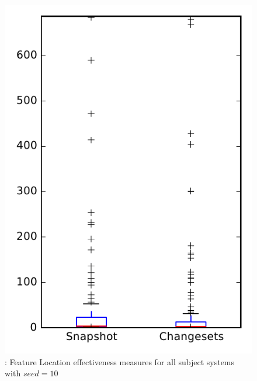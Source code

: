 
\begin{figure}
\centering
\includegraphics[height=0.4\textheight]{figures/flt_seed/rq1_overview_10}
\caption{\rone: Feature Location effectiveness measures for all subject systems with $seed=10$}
\label{fig:flt_seed:rq1:overview}
\end{figure}
